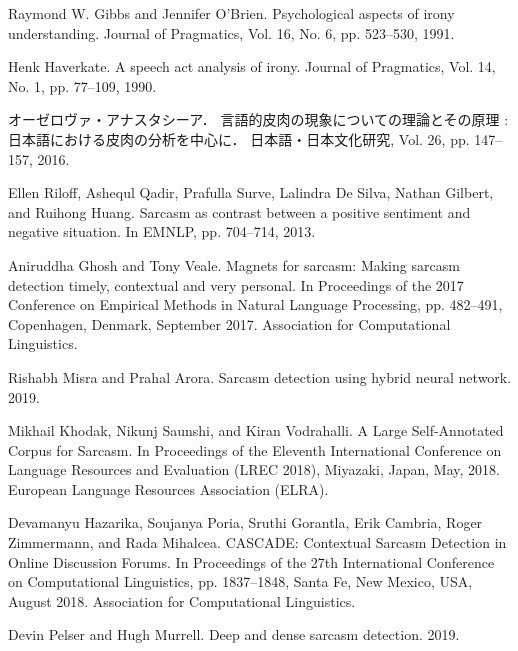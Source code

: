\newpage
\changeindent{0cm}
\begin{thebibliography}{99}
\changeindent{2cm}



Raymond W. Gibbs and Jennifer O’Brien. 
Psychological aspects of irony understanding. 
Journal of Pragmatics, Vol. 16, No. 6, pp. 523--530, 1991.


Henk Haverkate. 
A speech act analysis of irony. 
Journal of Pragmatics, Vol. 14, No. 1, pp. 77--109, 1990.


オーゼロヴァ・アナスタシーア．
言語的皮肉の現象についての理論とその原理 : 日本語における皮肉の分析を中心に．
日本語・日本文化研究, Vol. 26, pp. 147--157, 2016.

% 
Ellen Riloff, Ashequl Qadir, Prafulla Surve, Lalindra De Silva, Nathan Gilbert, and Ruihong Huang. 
Sarcasm as contrast between a positive sentiment and negative situation. 
In EMNLP, pp. 704--714, 2013.


Aniruddha Ghosh and Tony Veale. 
Magnets for sarcasm: Making sarcasm detection timely, contextual and very personal. 
In Proceedings of the 2017 Conference on Empirical Methods in Natural Language Processing, pp. 482--491, Copenhagen, Denmark, September 2017. Association for Computational Linguistics.


Rishabh Misra and Prahal Arora. 
Sarcasm detection using hybrid neural network. 
2019.


Mikhail Khodak, Nikunj Saunshi, and Kiran Vodrahalli.
A Large Self-Annotated Corpus for Sarcasm.
In Proceedings of the Eleventh International Conference on Language Resources and Evaluation (LREC 2018), Miyazaki, Japan, May, 2018. European Language Resources Association (ELRA).


Devamanyu Hazarika, Soujanya Poria, Sruthi Gorantla, Erik Cambria, Roger Zimmermann, and Rada Mihalcea.
CASCADE: Contextual Sarcasm Detection in Online Discussion Forums.
In Proceedings of the 27th International Conference on Computational Linguistics, pp. 1837--1848, Santa Fe, New Mexico, USA, August 2018. Association for Computational Linguistics.


Devin Pelser and Hugh Murrell.
Deep and dense sarcasm detection.
2019.




\end{thebibliography}
